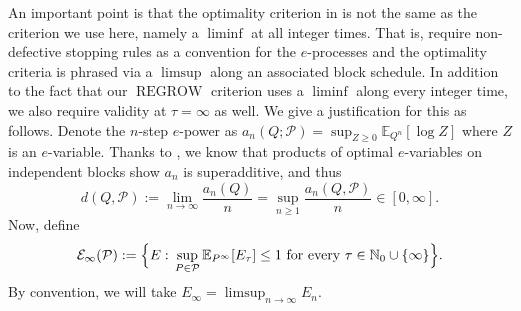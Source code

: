 \documentclass[11pt]{article}
\newcommand{\REGROW}{\operatorname{REGROW}}
\newcommand{\E}{\mathbb{E}}
\newcommand{\Pcal}{\mathcal{P}}
\theoremstyle{definition}
\theoremstyle{definition}
\begin{document}
An important point is that the optimality criterion in \cite{ramramdas2026optimalbettingwealth} is not the same as the criterion we use here, namely a $\liminf$ at all integer times. That is, \cite{ramramdas2026optimalbettingwealth} require non-defective stopping rules as a convention for the $e$-processes and the optimality criteria is phrased via a $\limsup$ along an associated block schedule. In addition to the fact that our $\REGROW$ criterion uses a $\liminf$ along every integer time, we also require validity at $\tau=\infty$ as well. We give a justification for this as follows. Denote the $n$-step $e$-power as $a_n(Q;\Pcal)=\sup_{Z\ge 0} \E_{Q^n}[\log Z]$ where $Z$ is an $e$-variable. Thanks to \cite{ramramdas2026optimalbettingwealth}, we know that products of optimal $e$-variables on independent blocks show $a_n$ is superadditive, and thus
\[
d(Q,\Pcal) :=\lim_{n\to\infty} \frac{a_n(Q)}{n}=\sup_{n\ge 1}\frac{a_n(Q,\Pcal)}{n}\in[0,\infty].
\]
Now, define
\[
\mathcal E_\infty(\Pcal) := \Bigl\{ E:\, \sup_{P\in\Pcal}\E_{P^\infty}[E_\tau]\le1 \text{ for every } \tau\in\mathbb N_0\cup\{\infty\} \Bigr\}.
\]
By convention, we will take $E_{\infty}=\limsup_{n\to\infty}E_n$.
\end{document}
